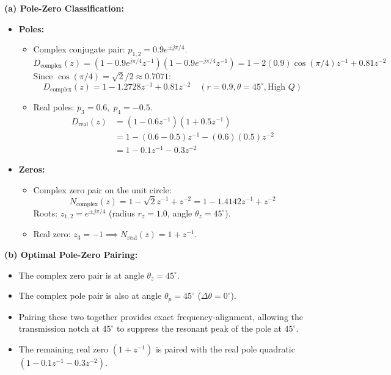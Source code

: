 \documentclass[11pt,a4paper]{article}
\begin{document}
\noindent\textbf{(a) Pole-Zero Classification:}
\begin{itemize}
    \item \textbf{Poles:}
    \begin{itemize}
        \item Complex conjugate pair: $p_{1,2} = 0.9 e^{\pm j\pi/4}$. 
        \begin{equation}
        D_{\text{complex}}(z) = (1 - 0.9 e^{j\pi/4} z^{-1})(1 - 0.9 e^{-j\pi/4} z^{-1}) = 1 - 2(0.9)\cos(\pi/4) z^{-1} + 0.81 z^{-2}
        \end{equation}
        Since $\cos(\pi/4) = \sqrt{2}/2 \approx 0.7071$:
        \begin{equation}
        D_{\text{complex}}(z) = 1 - 1.2728 z^{-1} + 0.81 z^{-2} \quad (r = 0.9, \theta = 45^\circ, \text{High } Q)
        \end{equation}
        \item Real poles: $p_3 = 0.6, \; p_4 = -0.5$.
        \begin{align}
        D_{\text{real}}(z) &= (1 - 0.6 z^{-1})(1 + 0.5 z^{-1}) \nonumber \\
        &= 1 - (0.6 - 0.5) z^{-1} - (0.6)(0.5) z^{-2} \nonumber \\
        &= 1 - 0.1 z^{-1} - 0.3 z^{-2}
        \end{align}
    \end{itemize}
    \item \textbf{Zeros:}
    \begin{itemize}
        \item Complex zero pair on the unit circle:
        \begin{equation}
        N_{\text{complex}}(z) = 1 - \sqrt{2} z^{-1} + z^{-2} = 1 - 1.4142 z^{-1} + z^{-2}
        \end{equation}
        Roots: $z_{1,2} = e^{\pm j\pi/4}$ (radius $r_z = 1.0$, angle $\theta_z = 45^\circ$).
        \item Real zero: $z_3 = -1 \implies N_{\text{real}}(z) = 1 + z^{-1}$.
    \end{itemize}
\end{itemize}

\noindent\textbf{(b) Optimal Pole-Zero Pairing:}
\begin{itemize}
    \item The complex zero pair is at angle $\theta_z = 45^\circ$.
    \item The complex pole pair is also at angle $\theta_p = 45^\circ$ ($\Delta\theta = 0^\circ$).
    \item Pairing these two together provides exact frequency-alignment, allowing the transmission notch at $45^\circ$ to suppress the resonant peak of the pole at $45^\circ$.
    \item The remaining real zero $(1 + z^{-1})$ is paired with the real pole quadratic $(1 - 0.1 z^{-1} - 0.3 z^{-2})$.
\end{itemize}
\end{document}
